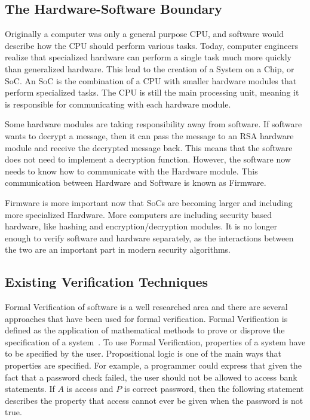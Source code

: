 \documentclass[../report.tex]{subfiles}
\begin{document}
\subsection{The Hardware-Software Boundary}

Originally a computer was only a general purpose CPU, and software would
describe how the CPU should perform various tasks.
Today, computer engineers realize that specialized hardware can perform a single
task much more quickly than generalized hardware.
This lead to the creation of a System on a Chip, or SoC. An SoC is the
combination of a CPU with smaller hardware modules that perform specialized
tasks.
The CPU is still the main processing unit, meaning it is responsible for
communicating with each hardware module.

Some hardware modules are taking responsibility away from software.
If software wants to decrypt a message, then it can pass the message to an RSA
hardware module and receive the decrypted message back.
This means that the software does not need to implement a decryption function.
However, the software now needs to know how to communicate with the Hardware
module. This communication between Hardware and Software is known as Firmware.

Firmware is more important now that SoCs are becoming larger and including more
specialized Hardware. 
More computers are including security based hardware, like hashing and encryption/decryption modules.
It is no longer enough to verify software and hardware separately, as the
interactions between the two are an important part in modern security
algorithms.

\subsection{Existing Verification Techniques}

Formal Verification of software is a well researched area and there are several approaches that have been used for formal verification.
Formal Verification is defined as the application of mathematical methods to
prove or disprove the specification of a system~\cite{greenstreet}.
To use Formal Verification, properties of a system have to be specified by the
user. 
Propositional logic is one of the main ways that properties are specified.
For example, a programmer could express that given the fact that a password
check failed, the user should not be allowed to access bank statements.
If $A$ is access and $P$ is correct password, then the following statement
describes the property that access cannot ever be given when the password is not
true.
\end{document}
